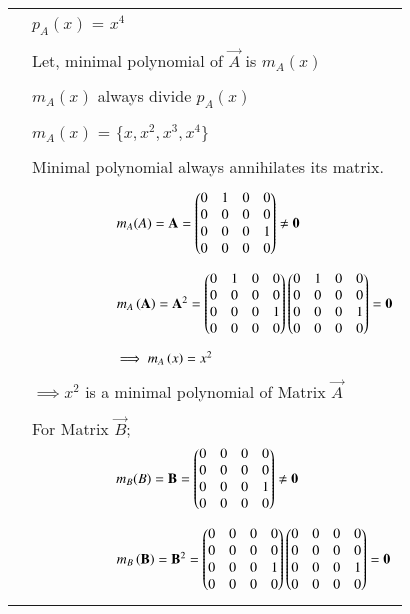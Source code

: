 \documentclass[journal,12pt]{IEEEtran}
\begin{document}
\begin{longtable}{|p{5cm}|p{13cm}|}
    & $p_A(x)$ = $x^4$ \\
    &\\
    & Let, minimal polynomial of $\vec{A}$ is $m_A(x)$\\
    &\\
    & $m_A(x)$ always divide $p_A(x)$ \\
    &\\
    & $m_A(x)$ = $\{x,x^2,x^3,x^4\}$\\
    &\\
    &  Minimal polynomial always annihilates its matrix.\\
    &\\
    \hline
    & $\qquad\qquad\qquad m_A(A) = \mathbf{A} =\begin{pmatrix}0&1&0&0\\0&0&0&0\\0&0&0&1\\0&0&0&0\end{pmatrix} \neq\mathbf{0}$\\
    &\\
    &$\qquad\qquad\qquad m_A\left(\mathbf{A}\right)=\mathbf{A}^2 =\begin{pmatrix}0&1&0&0\\0&0&0&0\\0&0&0&1\\0&0&0&0\end{pmatrix}\begin{pmatrix}0&1&0&0\\0&0&0&0\\0&0&0&1\\0&0&0&0\end{pmatrix}=\mathbf{0}$\\
    &\\
    & $ \qquad\qquad\qquad\implies m_A\left(x\right) = x^2$\\
    &\\
    & $\implies x^2$ is a minimal polynomial of Matrix $\vec{A}$\\
    &\\
    & For Matrix $\vec{B}$;\\
    &$\qquad\qquad\qquad m_B(B) = \mathbf{B} =\begin{pmatrix}0&0&0&0\\0&0&0&0\\0&0&0&1\\0&0&0&0\end{pmatrix} \neq\mathbf{0}$\\
    &\\
    &$\qquad\qquad\qquad m_B\left(\mathbf{B}\right)=\mathbf{B}^2 =\begin{pmatrix}0&0&0&0\\0&0&0&0\\0&0&0&1\\0&0&0&0\end{pmatrix}\begin{pmatrix}0&0&0&0\\0&0&0&0\\0&0&0&1\\0&0&0&0\end{pmatrix}=\mathbf{0}$\\
    &\\

\end{longtable}
\end{document}
